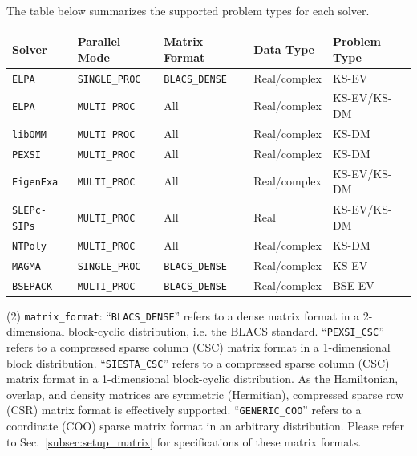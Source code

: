 \documentclass{report}
\begin{document}
The table below summarizes the supported problem types for each solver.

\begin{tabular}[]{|p{32mm}|p{32mm}|p{32mm}|p{32mm}|p{32mm}|}
\hline
\multicolumn{1}{|l|}{\textbf{Solver}} & \multicolumn{1}{l|}{\textbf{Parallel Mode}} & \multicolumn{1}{l|}{\textbf{Matrix Format}} & \multicolumn{1}{l|}{\textbf{Data Type}} & \multicolumn{1}{l|}{\textbf{Problem Type}}\\
\hline
\texttt{ELPA}       & \texttt{SINGLE\_PROC} & \texttt{BLACS\_DENSE} & Real/complex & KS-EV\\
\hline
\texttt{ELPA}       & \texttt{MULTI\_PROC}  & All                   & Real/complex & KS-EV/KS-DM\\
\hline
\texttt{libOMM}     & \texttt{MULTI\_PROC}  & All                   & Real/complex & KS-DM\\
\hline
\texttt{PEXSI}      & \texttt{MULTI\_PROC}  & All                   & Real/complex & KS-DM\\
\hline
\texttt{EigenExa}   & \texttt{MULTI\_PROC}  & All                   & Real/complex & KS-EV/KS-DM\\
\hline
\texttt{SLEPc-SIPs} & \texttt{MULTI\_PROC}  & All                   & Real         & KS-EV/KS-DM\\
\hline
\texttt{NTPoly}     & \texttt{MULTI\_PROC}  & All                   & Real/complex & KS-DM\\
\hline
\texttt{MAGMA}      & \texttt{SINGLE\_PROC} & \texttt{BLACS\_DENSE} & Real/complex & KS-EV\\
\hline
\texttt{BSEPACK}    & \texttt{MULTI\_PROC}  & \texttt{BLACS\_DENSE} & Real/complex & BSE-EV\\
\hline
\end{tabular}

(2) \texttt{matrix\_format}: ``\texttt{BLACS\_DENSE}'' refers to a dense matrix format in a 2-dimensional block-cyclic distribution, i.e. the BLACS standard. ``\texttt{PEXSI\_CSC}'' refers to a compressed sparse column (CSC) matrix format in a 1-dimensional block distribution. ``\texttt{SIESTA\_CSC}'' refers to a compressed sparse column (CSC) matrix format in a 1-dimensional block-cyclic distribution. As the Hamiltonian, overlap, and density matrices are symmetric (Hermitian), compressed sparse row (CSR) matrix format is effectively supported. ``\texttt{GENERIC\_COO}'' refers to a coordinate (COO) sparse matrix format in an arbitrary distribution. Please refer to Sec.~\ref{subsec:setup_matrix} for specifications of these matrix formats.
\end{document}
